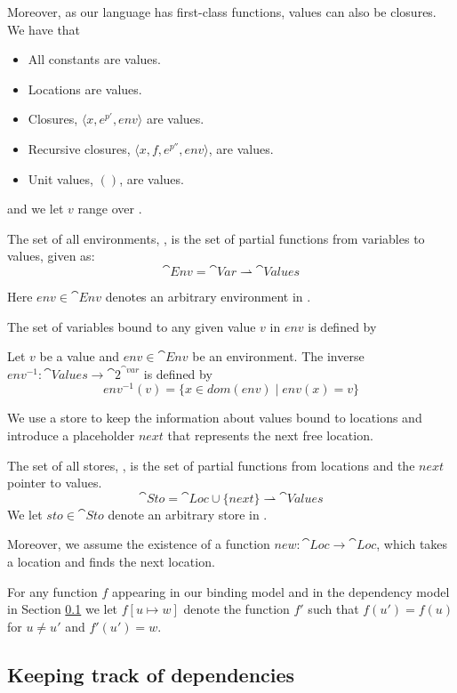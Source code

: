 \documentclass[acmsmall,sigplan]{acmart}
\begin{document}
Moreover, as our language has first-class functions, values can also be closures.
We have that
\begin{itemize}
	\item All constants are values.
	\item Locations are values.
	\item Closures, $\langle x,e^{p'},env\rangle$ are values.
	\item Recursive closures, $\langle x,f,e^{p''},env\rangle$, are values.
	\item Unit values, $()$, are values.
\end{itemize}

and we let $v$ range over .

\begin{definition}
	The set of all environments, , is the set of partial functions from variables to values, given as:
	$$\cat{Env}=\cat{Var}\rightharpoonup\cat{Values}$$
\end{definition}
%
Here $env\in\cat{Env}$ denotes an arbitrary environment in .

The set of variables bound to any given value $v$ in $env$ is defined by 
\begin{definition}
  Let $v$ be a value and $env\in\cat{Env}$ be an environment. The
  inverse $env^{-1} : \cat{Values} \to \cat{2}^{\cat{var}}$
  is defined by
	\[ env^{-1}(v)=\{x\in dom(env)\mid env(x)=v\} \]
\end{definition}
%
We use a store to keep the information about values bound to locations
and introduce a placeholder $next$ that represents the next free location.

\begin{definition}
	The set of all stores, , is the set of partial functions from locations and the $next$ pointer to values.
\[ \cat{Sto}=\cat{Loc}\cup\{next\}\rightharpoonup\cat{Values} \]
We let $sto\in\cat{Sto}$ denote an arbitrary store in .
\end{definition}

Moreover, we assume the existence of a function
$new:\cat{Loc}\rightarrow\cat{Loc}$, which takes a location and finds
the next location.

For any function $f$ appearing in our binding model and in the
dependency model in Section \ref{sec:DepFunc} we let $f[u
\mapsto w]$ denote the function $f'$ such that $f(u') = f(u)$ for $u
\neq u'$ and $f'(u') = w$.

\subsection{Keeping track of dependencies}\label{sec:DepFunc}
\end{document}

